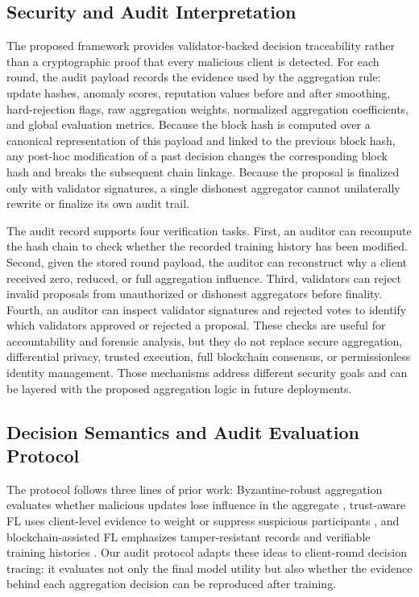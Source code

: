 \documentclass[preprint,authoryear,12pt]{elsarticle}
\begin{document}
\subsection{Security and Audit Interpretation}

The proposed framework provides validator-backed decision traceability rather than a cryptographic proof that every malicious client is detected. For each round, the audit payload records the evidence used by the aggregation rule: update hashes, anomaly scores, reputation values before and after smoothing, hard-rejection flags, raw aggregation weights, normalized aggregation coefficients, and global evaluation metrics. Because the block hash is computed over a canonical representation of this payload and linked to the previous block hash, any post-hoc modification of a past decision changes the corresponding block hash and breaks the subsequent chain linkage. Because the proposal is finalized only with validator signatures, a single dishonest aggregator cannot unilaterally rewrite or finalize its own audit trail.

The audit record supports four verification tasks. First, an auditor can recompute the hash chain to check whether the recorded training history has been modified. Second, given the stored round payload, the auditor can reconstruct why a client received zero, reduced, or full aggregation influence. Third, validators can reject invalid proposals from unauthorized or dishonest aggregators before finality. Fourth, an auditor can inspect validator signatures and rejected votes to identify which validators approved or rejected a proposal. These checks are useful for accountability and forensic analysis, but they do not replace secure aggregation, differential privacy, trusted execution, full blockchain consensus, or permissionless identity management. Those mechanisms address different security goals and can be layered with the proposed aggregation logic in future deployments.

\subsection{Decision Semantics and Audit Evaluation Protocol}

The protocol follows three lines of prior work: Byzantine-robust aggregation evaluates whether malicious updates lose influence in the aggregate \citep{blanchard2017krum,yin2018byzantine,pillutla2022rfa}, trust-aware FL uses client-level evidence to weight or suppress suspicious participants \citep{cao2021fltrust,fung2020foolsgold}, and blockchain-assisted FL emphasizes tamper-resistant records and verifiable training histories \citep{lu2020blockchain,nguyen2021blockchainedge,dong2024blockchain,awan2022blockchainflsurvey}. Our audit protocol adapts these ideas to client-round decision tracing: it evaluates not only the final model utility but also whether the evidence behind each aggregation decision can be reproduced after training.
\end{document}
